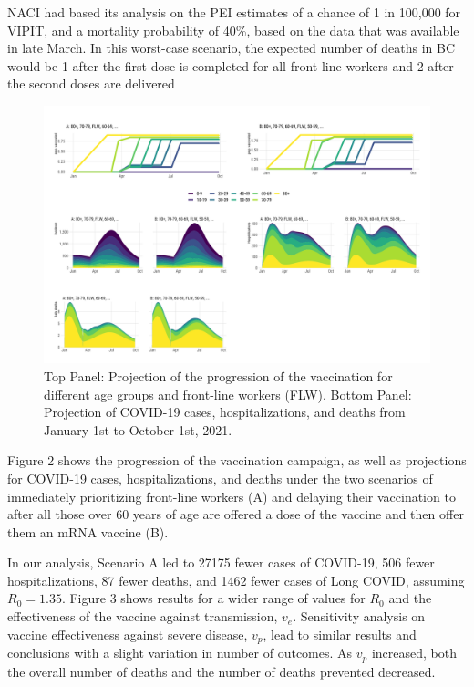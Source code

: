 \documentclass[]{interact}
\theoremstyle{plain}%
\theoremstyle{definition}
\theoremstyle{remark}
\begin{document}
NACI had based its analysis on the PEI estimates of a chance of 1 in
100,000 for VIPIT, and a mortality probability of 40\%, based on the
data that was available in late March. In this worst-case scenario, the
expected number of deaths in BC would be 1 after the first dose is
completed for all front-line workers and 2 after the second doses are
delivered

\begin{figure}

{\centering \includegraphics[width=1\linewidth]{../figures/fig-trajectoriesFull} 

}

\caption{Top Panel: Projection of the progression of the vaccination for different age groups and front-line workers (FLW). Bottom Panel: Projection of COVID-19 cases, hospitalizations, and deaths from January 1st to October 1st, 2021.}\label{fig:fig1}
\end{figure}

Figure 2 shows the progression of the vaccination campaign, as well as
projections for COVID-19 cases, hospitalizations, and deaths under the
two scenarios of immediately prioritizing front-line workers (A) and
delaying their vaccination to after all those over 60 years of age are
offered a dose of the vaccine and then offer them an mRNA vaccine (B).

In our analysis, Scenario A led to 27175 fewer cases of COVID-19, 506
fewer hospitalizations, 87 fewer deaths, and 1462 fewer cases of Long
COVID, assuming \(R_0=1.35\). Figure 3 shows results for a wider range
of values for \(R_0\) and the effectiveness of the vaccine against
transmission, \(v_e\). Sensitivity analysis on vaccine effectiveness
against severe disease, \(v_p\), lead to similar results and conclusions
with a slight variation in number of outcomes. As \(v_p\) increased,
both the overall number of deaths and the number of deaths prevented
decreased.
\end{document}
